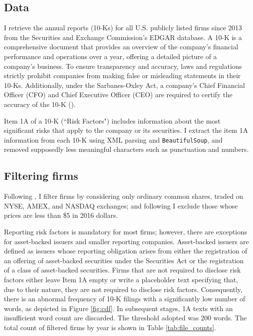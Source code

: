 \documentclass[12pt, letterpaper]{article}
\begin{document}
\subsection{Data}

I retrieve the annual reports (10-Ks) for all U.S. publicly listed firms since 2013 from the Securities and Exchange Commission's EDGAR database. A 10-K is a comprehensive document that provides an overview of the company's financial performance and operations over a year, offering a detailed picture of a company's business.  To ensure transparency and accuracy, laws and regulations strictly prohibit companies from making false or misleading statements in their 10-Ks. Additionally, under the Sarbanes-Oxley Act, a company's Chief Financial Officer (CFO) and Chief Executive Officer (CEO) are required to certify the accuracy of the 10-K (\cite{SEC_Office_of_Investor_Education_and_Advocacy2011-tw}).

Item 1A of a 10-K (``Risk Factors") includes information about the most significant risks that apply to the company or its securities.  I extract the item 1A information from each 10-K using XML parsing and \texttt{BeautifulSoup}, and removed supposedly less meaningful characters such as punctuation and numbers.

\subsection{Filtering firms}

Following \cite{Golubov2019-ku, Stambaugh2016-eb}, I filter firms by considering only ordinary common shares, traded on NYSE, AMEX, and NASDAQ exchanges; and following \cite{Stambaugh2016-eb} I exclude those whose prices are less than \$5 in 2016 dollars. 

Reporting risk factors is mandatory for most firms; however, there are exceptions for asset-backed issuers and smaller reporting companies. Asset-backed issuers are defined as issuers whose reporting obligation arises from either the registration of an offering of asset-backed securities under the Securities Act or the registration of a class of asset-backed securities. Firms that are not required to disclose risk factors either leave Item 1A empty or write a placeholder text specifying that, due to their nature, they are not required to disclose risk factors. Consequently, there is an abnormal frequency of 10-K filings with a significantly low number of words, as depicted in Figure \ref{fig:cdf}. In subsequent stages, 1A texts with an insufficient word count are discarded. The threshold adopted was 200 words. The total count of filtered firms by year is shown in Table \ref{tab:file_counts}.
\end{document}
